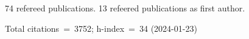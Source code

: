 74 refereed publications. 13 refeered publications as first author.

Total citations~=~3752; h-index~=~34 (2024-01-23)